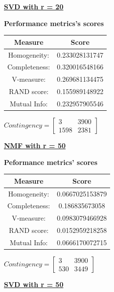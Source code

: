 \documentclass{report}
\begin{document}
\underline{\textbf{SVD with r = 20}} \\

\begin{center}
	\textbf{Performance metrics's scores} \\ \vspace{10pt}
	\begin{tabular}{*{2}{c}}
		\toprule
		\textbf{Measure} & \textbf{Score} \\
		\midrule
		Homogeneity: & 0.233028131747 \\
		\midrule
		Completeness: & 0.320016548166 \\
		\midrule
		V-measure: 	& 0.269681134475 \\
		\midrule
		RAND score: & 0.155989148922 \\
		\midrule
		Mutual Info: & 0.232957905546 \\
		\bottomrule
	\end{tabular}
	\qquad
	$Contingency = \left[ \begin{array}{*{2}{c}}
		3 		& 3900 \\
		1598 	& 2381 
			\end{array}\right]
			$
\end{center}


\underline{\textbf{NMF with r = 50}} \\

\begin{center}
	\textbf{Peformance metrics' scores} \\ \vspace{10pt}	
	\begin{tabular}{*{2}{c}}
		\toprule
		\textbf{Measure} & \textbf{Score} \\	
		\midrule	
		Homogeneity: & 0.0667025153879 \\
		\midrule
		Completeness: & 0.186835673058 \\
		\midrule
		V-measure: & 0.0983079466928 \\
		\midrule
		RAND score: & 0.0152959218258 \\
		\midrule
		Mutual Info: & 0.0666170072715 \\
		\bottomrule
	\end{tabular}
	\qquad	
	$Contingency = \left[\begin{array}{*{2}{c}}
			3 	& 3900 \\
			530 & 3449 
				\end{array}\right]
		$
\end{center}


\underline{\textbf{SVD with r = 50}} \\
\end{document}
